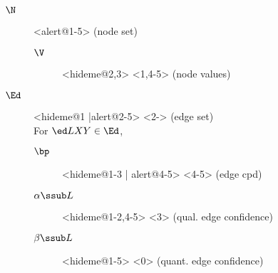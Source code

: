 \begin{frame} %
	\setlength{\pdgdefnwidth}{0.7\textwidth}
	
	\vspace{-0.5em}
	\begin{columns}[t]
		\hfill
		\column{\pdgdefnwidth}
		\begin{defn}[PDG]\label{def:model}
			\begin{description}%
				\item[$\N$]<alert@1-5> \notation{$:\Set$}%
					\hfill (node set)
					\begin{description}
						\item[$\V$]<hideme@2,3> \notation{$:\N \to \Set$}<1,4-5>%
							\hfill (node values)%
						\end{description}

				\item[$\Ed$]<hideme@1 |alert@2-5> <2->%
					\hfill (edge set)\\[0.14em]
					{\color{gray}For $\ed LXY \in \Ed$,}
					\begin{description}%
						\item[$\bp$]<hideme@1-3 | alert@4-5> %
							<4-5>%
							\hfill (edge cpd)
						\item[$\alpha\ssub L$]<hideme@1-2,4-5> \notation{$: [0,1]$}<3>%
							\hfill(qual. edge  confidence)
						\item[$\beta\ssub L$]<hideme@1-5> <0>%
							\hfill(quant. edge confidence)
						\end{description}
				\end{description}
			\end{defn}
			\hfill
		\end{columns}
		

\end{frame}
